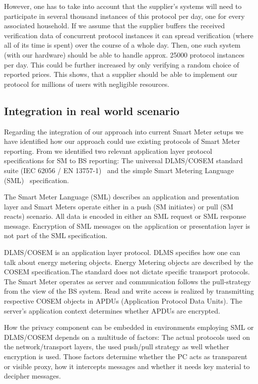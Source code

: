 \documentclass[english]{llncs}
\begin{document}
However, one has to take into account that the supplier's systems will need to participate in several thousand instances of this protocol per day, one for every associated household. If we assume that the supplier buffers the received verification data of concurrent protocol instances it can spread verification (where all of its time is spent) over the course of a whole day. Then, one such system (with our hardware) should be able to handle approx. 25000 protocol instances per day. This could be further increased by only verifying a random choice of reported prices. This shows, that a supplier should be able to implement our protocol for millions of users with negligible resources.

\subsection{Integration in real world scenario}\label{realworld}
Regarding the integration of our approach into current Smart Meter setups we have identified how our approach could use existing protocols of Smart Meter reporting. 
From \cite{smartmeterstandardcomparison} we identified two relevant application layer protocol specifications for SM to BS reporting: The universal DLMS/COSEM standard suite (IEC 62056 / EN 13757-1)~\cite{dlmscosem} and the simple Smart Metering Language~ (SML)~\cite{sml} specification. 

The Smart Meter Language (SML) describes an application and presentation layer and Smart Meters operate either in a push (SM initiates) or pull (SM reacts) scenario. 
All data is encoded in either an SML request or SML response message. Encryption of SML messages on the application or presentation layer is not part of the SML specification.


DLMS/COSEM is an application layer protocol. DLMS specifies how one can talk about energy metering objects. Energy Metering objects are described by the COSEM specification.The standard does not dictate specific transport protocols. The Smart Meter operates as server and communication follows the pull-strategy from the view of the BS system. Read and write access is realized by transmitting respective COSEM objects in APDUs (Application Protocol Data Units). The server's application context determines whether APDUs are encrypted.


How the privacy component can be embedded in environments employing SML or DLMS/COSEM depends on a multitude of factors: The actual protocols used on the network/transport layers, the used push/pull strategy as well whether encryption is used. Those factors determine whether the PC acts as transparent or visible proxy, how it intercepts messages and whether it needs key material to decipher messages.
\end{document}
